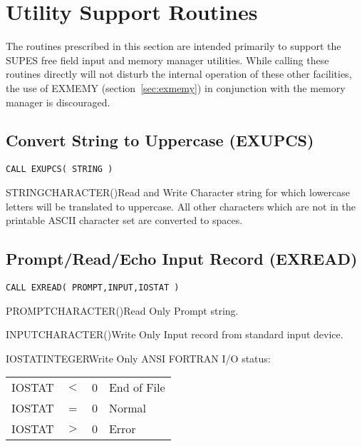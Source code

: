 \section{Utility Support Routines}
The routines prescribed in this section are intended primarily to support
the SUPES free field input and memory manager utilities.  While calling
these routines directly will not disturb the internal operation of these
other facilities, the use of EXMEMY (section~\ref{sec:exmemy}) in
conjunction with the memory manager is discouraged.

\subsection{Convert String to Uppercase (EXUPCS)} \label{sec:exupcs}

\verb+CALL EXUPCS( STRING )+

\begin{argy}{STRING}{CHARACTER\last(\last)}{Read and Write}
Character string for which lowercase letters will be translated to
uppercase.  All other characters which are not in the printable ASCII character
set are converted to spaces.
\end{argy}

\subsection{Prompt/Read/Echo Input Record (EXREAD)} \label{sec:exread}

\verb+CALL EXREAD( PROMPT,INPUT,IOSTAT )+

\begin{argy}{PROMPT}{CHARACTER\last(\last)}{Read Only}
Prompt string.
\end{argy}

\begin{argy}{INPUT}{CHARACTER\last(\last)}{Write Only}
Input record from standard input device.
\end{argy}

\begin{argy}{IOSTAT}{INTEGER}{Write Only}
ANSI FORTRAN I/O status:\\
\begin{tabular}{cccl}
IOSTAT &$<$ & 0 & End of File\\
IOSTAT &=   & 0 & Normal\\
IOSTAT &$>$ & 0 & Error\\
\end{tabular}
\end{argy}

